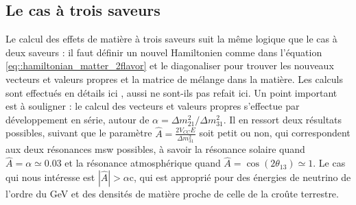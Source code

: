         \subsection{Le cas à trois saveurs}
            Le calcul des effets de matière à trois saveurs suit la même logique que le cas à deux saveurs : il faut définir un nouvel Hamiltonien comme dans l'équation \eqref{eq::hamiltonian_matter_2flavor} et le diagonaliser pour trouver les nouveaux vecteurs et valeurs propres et la matrice de mélange dans la matière. Les calculs sont effectués en détails ici \cite{Freund2001}, aussi ne sont-ils pas refait ici. Un point important est à souligner : le calcul des vecteurs et valeurs propres s'effectue par développement en série, autour de $\alpha=\Delta m^2_{21}/\Delta m^2_{31}$. Il en ressort deux résultats possibles, suivant que le paramètre $\hat{A}=\frac{2V_{CC}E}{\Delta m^2_{31}}$ soit petit ou non, qui correspondent aux deux résonances \gls{msw} possibles, à savoir la résonance solaire quand $\hat{A}=\alpha\simeq0.03$ et la résonance atmosphérique quand $\hat{A}=\cos(2\theta_{13})\simeq 1$. Le cas qui nous intéresse est $|\hat{A}|>\alpha$c, qui est approprié pour des énergies de neutrino de l'ordre du \si{\giga\electronvolt} et des densités de matière proche de celle de la croûte terrestre.
            
